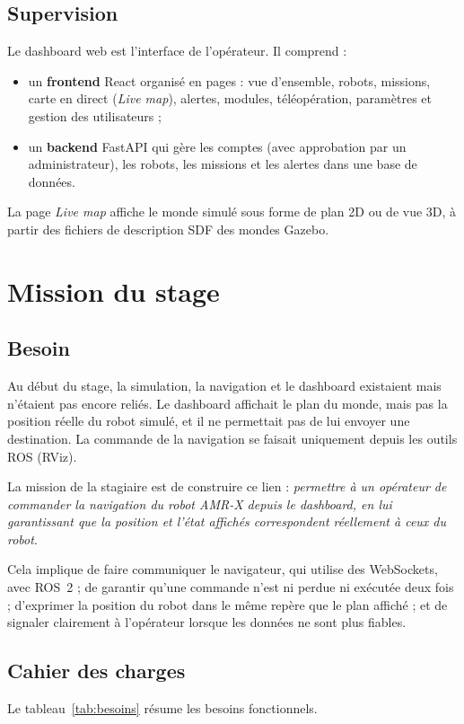 \subsection{Supervision}
Le dashboard web est l'interface de l'opérateur. Il comprend :
\begin{itemize}
  \item un \textbf{frontend} React organisé en pages : vue d'ensemble, robots, missions,
    carte en direct (\emph{Live map}), alertes, modules, téléopération, paramètres et
    gestion des utilisateurs ;
  \item un \textbf{backend} FastAPI qui gère les comptes (avec approbation par un
    administrateur), les robots, les missions et les alertes dans une base de données.
\end{itemize}
La page \emph{Live map} affiche le monde simulé sous forme de plan 2D ou de vue 3D,
à partir des fichiers de description SDF des mondes Gazebo.

\section{Mission du stage}

\subsection{Besoin}
Au début du stage, la simulation, la navigation et le dashboard existaient mais
n'étaient pas encore reliés. Le dashboard affichait le plan du monde, mais pas la position
réelle du robot simulé, et il ne permettait pas de lui envoyer une destination. La
commande de la navigation se faisait uniquement depuis les outils ROS (RViz).

La mission de la stagiaire est de construire ce lien : \emph{permettre à un opérateur de
commander la navigation du robot AMR-X depuis le dashboard, en lui garantissant que la
position et l'état affichés correspondent réellement à ceux du robot}.

Cela implique de faire communiquer le navigateur, qui utilise des WebSockets, avec
ROS~2 ; de garantir qu'une commande n'est ni perdue ni exécutée deux fois ; d'exprimer la
position du robot dans le même repère que le plan affiché ; et de signaler clairement à
l'opérateur lorsque les données ne sont plus fiables.

\subsection{Cahier des charges}
Le tableau~\ref{tab:besoins} résume les besoins fonctionnels.

